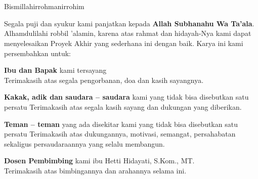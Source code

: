 \chapter*{\Persembahan}
\begin{center}
Bismillahirrohmanirrohim
\end{center}
\begin{center}
Segala puji dan syukur kami panjatkan kepada \textbf{Allah Subhanahu Wa Ta’ala}. Alhamdulilahi robbil ’alamin, karena atas rahmat dan hidayah-Nya kami dapat menyelesaikan Proyek Akhir yang sederhana ini dengan baik. Karya ini kami persembahkan untuk:
\end{center}

\begin{center}
\textbf{Ibu dan Bapak} kami tersayang
\\
Terimakasih atas segala pengorbanan, doa dan kasih sayangnya.
\end{center}


\begin{center}
\textbf{Kakak, adik dan saudara – saudara} kami yang tidak bisa disebutkan satu persatu
Terimakasih atas segala kasih sayang dan dukungan yang diberikan.
\end{center}

\begin{center}
\textbf{Teman – teman} yang ada disekitar kami yang tidak bisa disebutkan satu persatu
Terimakasih atas dukungannya, motivasi, semangat, persahabatan sekaligus persaudaraannya yang selalu membangun.
\end{center}

\begin{center}
\textbf{Dosen Pembimbing} kami ibu Hetti Hidayati, S.Kom., MT.
\\
Terimakasih atas bimbingannya dan arahannya selama ini.
\end{center}

